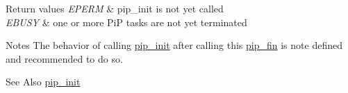 \begin{DoxyRetVals}{Return values}
{\em E\-P\-E\-R\-M} & {\ttfamily pip\-\_\-init} is not yet called \\
\hline
{\em E\-B\-U\-S\-Y} & {\ttfamily one} or more Pi\-P tasks are not yet terminated\\
\hline
\end{DoxyRetVals}
\begin{DoxyParagraph}{Notes}
The behavior of calling \hyperlink{group__PiP-0-init-fin_ga20439326ff318c2dd0752bd544dca0e2}{pip\-\_\-init} after calling this \hyperlink{group__PiP-0-init-fin_gac4654282785abb9434ce81573fdf16ed}{pip\-\_\-fin} is note defined and recommended to do so.
\end{DoxyParagraph}
\begin{DoxySeeAlso}{See Also}
\hyperlink{group__PiP-0-init-fin_ga20439326ff318c2dd0752bd544dca0e2}{pip\-\_\-init} 
\end{DoxySeeAlso}
